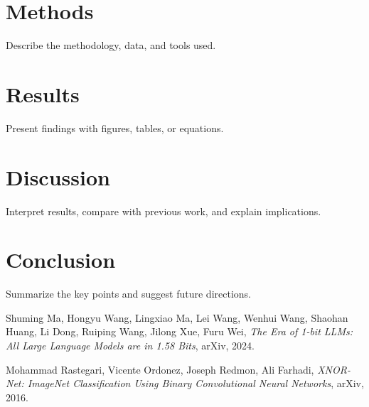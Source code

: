 \documentclass{article}
\begin{document}
\section{Methods}
Describe the methodology, data, and tools used.

\section{Results}
Present findings with figures, tables, or equations.

\section{Discussion}
Interpret results, compare with previous work, and explain implications.

\section{Conclusion}
Summarize the key points and suggest future directions.

\begin{thebibliography}{9}

Shuming Ma, Hongyu Wang, Lingxiao Ma, Lei Wang, Wenhui Wang, Shaohan Huang, Li Dong, Ruiping Wang, Jilong Xue, Furu Wei, \textit{The Era of 1-bit LLMs: All Large Language Models are in 1.58 Bits}, arXiv, 2024.

Mohammad Rastegari, Vicente Ordonez, Joseph Redmon, Ali Farhadi, \textit{XNOR-Net: ImageNet Classification Using Binary Convolutional Neural Networks}, arXiv, 2016.

\end{thebibliography}
\end{document}
